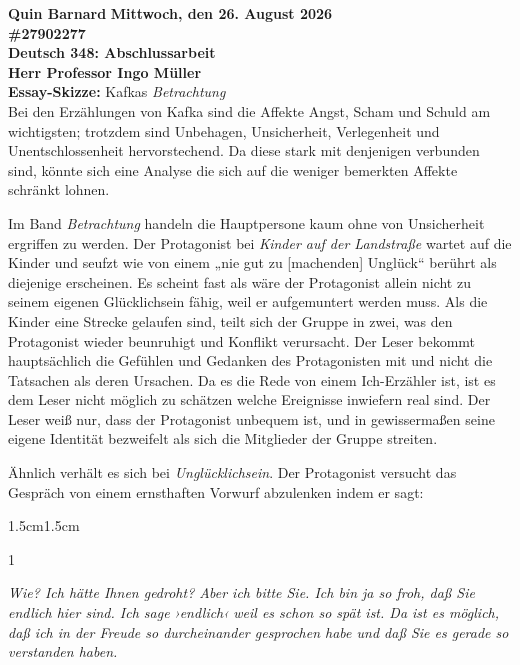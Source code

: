 \documentclass[12pt,a4paper]{article}
\begin{document}
\textbf{Quin Barnard}
\hfill
\textbf{Mittwoch, den 26. August 2026}\\
\textbf{\#27902277}\\
\textbf{Deutsch 348: Abschlussarbeit}\\
\textbf{Herr Professor Ingo Müller}\\
\textbf{Essay-Skizze:} Kafkas \textit{Betrachtung}\\

Bei den Erzählungen von Kafka sind die Affekte Angst, Scham und Schuld am wichtigsten; trotzdem sind Unbehagen, Unsicherheit, Verlegenheit und Unentschlossenheit hervorstechend. Da diese stark mit denjenigen verbunden sind, könnte sich eine Analyse die sich auf die weniger bemerkten Affekte schränkt lohnen.\par

Im Band \textit{Betrachtung} handeln die Hauptpersone kaum ohne von Unsicherheit ergriffen zu werden. Der Protagonist bei \textit{Kinder auf der Landstraße} wartet auf die Kinder und seufzt wie von einem „nie gut zu [machenden] Unglück“ berührt als diejenige erscheinen. Es scheint fast als wäre der Protagonist allein nicht zu seinem eigenen Glücklichsein fähig, weil er aufgemuntert werden muss. Als die Kinder eine Strecke gelaufen sind, teilt sich der Gruppe in zwei, was den Protagonist wieder beunruhigt und Konflikt verursacht. Der Leser bekommt hauptsächlich die Gefühlen und Gedanken des Protagonisten mit und nicht die Tatsachen als deren Ursachen. Da es die Rede von einem Ich-Erzähler ist, ist es dem Leser nicht möglich zu schätzen welche Ereignisse inwiefern real sind. Der Leser weiß nur, dass der Protagonist unbequem ist, und in gewissermaßen seine eigene Identität bezweifelt als sich die Mitglieder der Gruppe streiten.\par

Ähnlich verhält es sich bei \textit{Unglücklichsein}. Der Protagonist versucht das Gespräch von einem ernsthaften Vorwurf abzulenken indem er sagt: 

\begin{adjustwidth}{1.5cm}{1.5cm}
    \begin{spacing}{1}
        \begin{center}
            \small
                \textit{Wie? Ich hätte Ihnen gedroht? Aber ich bitte Sie. Ich bin ja so froh, daß Sie endlich hier sind. Ich sage ›endlich‹ weil es schon so spät ist. Da ist es möglich, daß ich in der Freude so durcheinander gesprochen habe und daß Sie es gerade so verstanden haben.}
        \end{center}
    \end{spacing}
\end{adjustwidth}
\end{document}
